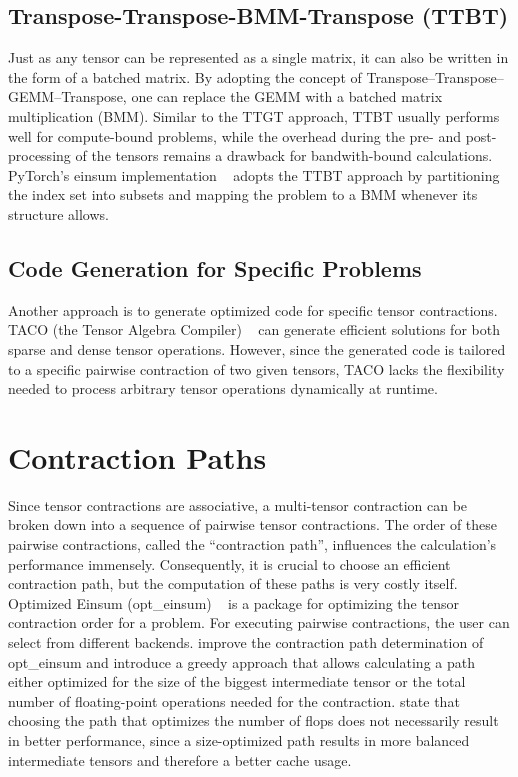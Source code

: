 \subsection{Transpose-Transpose-BMM-Transpose (TTBT)}
\sloppy
Just as any tensor can be represented as a single matrix, it can also be written in the form of a batched matrix.
By adopting the concept of Transpose–Transpose–GEMM–Transpose, one can replace the GEMM with a batched matrix multiplication (BMM). Similar to the TTGT approach, TTBT usually performs well for compute-bound problems, while the overhead during the pre- and post-processing of the tensors remains a drawback for bandwith-bound calculations.\\
PyTorch’s einsum implementation ~\cite{PyTorch} adopts the TTBT approach by partitioning the index set into subsets and mapping the problem to a BMM whenever its structure allows.

\subsection{Code Generation for Specific Problems}
Another approach is to generate optimized code for specific tensor contractions. TACO (the Tensor Algebra Compiler) ~\cite{kjolstad2017taco} can generate efficient solutions for both sparse and dense tensor operations. However, since the generated code is tailored to a specific pairwise contraction of two given tensors, TACO lacks the flexibility needed to process arbitrary tensor operations dynamically at runtime.

\section{Contraction Paths}
Since tensor contractions are associative, a multi-tensor contraction can be broken down into a sequence of pairwise tensor contractions. The order of these pairwise contractions, called the ``contraction path'', influences the calculation's performance immensely. Consequently, it is crucial to choose an efficient contraction path, but the computation of these paths is very costly itself. 
Optimized Einsum (opt\_einsum) ~\cite{opteinsum} 
is a package for optimizing the tensor contraction order for a problem. For executing pairwise contractions, the user can select from different backends. \textcite{cgreedy} improve the contraction path determination of opt\_einsum and introduce a greedy approach that allows calculating a path either optimized for the size of the biggest intermediate tensor or the total number of floating-point operations needed for the contraction. \textcite{blacher2024einsum} state that choosing the path that optimizes the number of flops does not necessarily result in better performance, since a size-optimized path results in more balanced intermediate tensors and therefore a better cache usage. 
